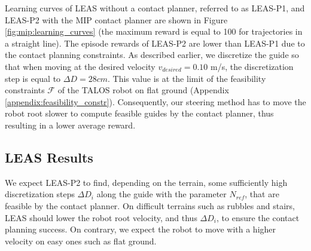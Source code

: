 Learning curves of LEAS without a contact planner, referred to as LEAS-P1, and LEAS-P2 with the MIP contact planner are shown in Figure \ref{fig:mip:learning_curves} (the maximum reward is equal to 100 for trajectories in a straight line).
The episode rewards of LEAS-P2 are lower than LEAS-P1 due to the contact planning constraints. 
As described earlier, we discretize the guide so that when moving at the desired velocity $v_{desired}=0.10$ m/s, the discretization step is equal to $\Delta D=28cm$. 
This value is at the limit of the feasibility constraints $\mathcal{F}$ of the TALOS robot on flat ground (Appendix \ref{appendix:feasibility_constr}). 
Consequently, our steering method has to move the robot root slower to compute feasible guides by the contact planner, thus resulting in a lower average reward.



\subsection{LEAS Results}
\label{subsub:mip:results}





We expect LEAS-P2 to find, depending on the terrain, some sufficiently high discretization steps $\Delta D_i$ along the guide with the parameter $N_{ref}$, that are feasible by the contact planner.
On difficult terrains such as rubbles and stairs, LEAS should lower the robot root velocity, and thus $\Delta D_i$, to ensure the contact planning success. 
On contrary, we expect the robot to move with a higher velocity on easy ones such as flat ground.

